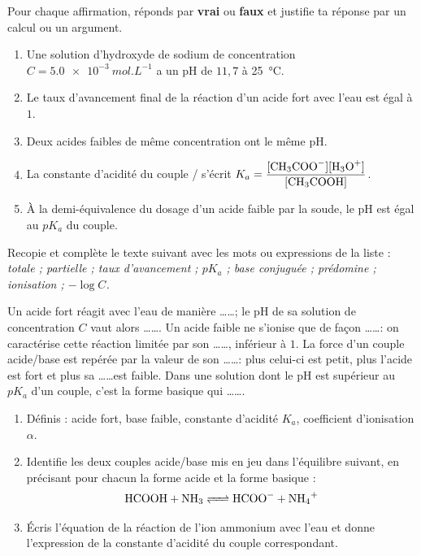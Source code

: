 \documentclass[11pt]{article}
\begin{document}
\begin{exercice}
Pour chaque affirmation, réponds par \textbf{vrai} ou \textbf{faux} et justifie ta réponse par un calcul ou un argument.
\begin{enumerate}
\item Une solution d'hydroxyde de sodium de concentration $C = \SI{5,0e-3}{mol.L^{-1}}$ a un pH de $11{,}7$ à \SI{25}{\celsius}.
\item Le taux d'avancement final de la réaction d'un acide fort avec l'eau est égal à $1$.
\item Deux acides faibles de même concentration ont le même pH.
\item La constante d'acidité du couple / s'écrit $K_a = \dfrac{[\ce{CH3COO-}][\ce{H3O+}]}{[\ce{CH3COOH}]}$.
\item À la demi-équivalence du dosage d'un acide faible par la soude, le pH est égal au $pK_a$ du couple.
\end{enumerate}
\end{exercice}

\begin{exercice}
Recopie et complète le texte suivant avec les mots ou expressions de la liste : \emph{totale ; partielle ; taux d'avancement ; $pK_a$ ; base conjuguée ; prédomine ; ionisation ; $-\log C$.}

Un acide fort réagit avec l'eau de manière \ldots\ldots ; le pH de sa solution de concentration $C$ vaut alors \ldots\ldots. Un acide faible ne s'ionise que de façon \ldots\ldots : on caractérise cette réaction limitée par son \ldots\ldots, inférieur à $1$. La force d'un couple acide/base est repérée par la valeur de son \ldots\ldots : plus celui-ci est petit, plus l'acide est fort et plus sa \ldots\ldots est faible. Dans une solution dont le pH est supérieur au $pK_a$ d'un couple, c'est la forme basique qui \ldots\ldots.
\end{exercice}

\begin{exercice}
\begin{enumerate}
\item Définis : acide fort, base faible, constante d'acidité $K_a$, coefficient d'ionisation $\alpha$.
\item Identifie les deux couples acide/base mis en jeu dans l'équilibre suivant, en précisant pour chacun la forme acide et la forme basique :
\[ \ce{HCOOH + NH3 <=> HCOO- + NH4+} \]
\item Écris l'équation de la réaction de l'ion ammonium  avec l'eau et donne l'expression de la constante d'acidité du couple correspondant.
\end{enumerate}
\end{exercice}
\end{document}
